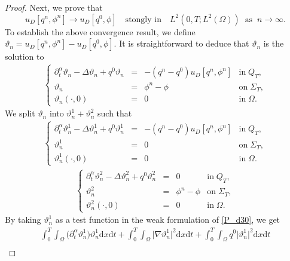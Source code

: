 \documentclass[10pt,a4paper]{amsart}
\newcommand{\dt} {\displaystyle\mathrm{d}t}
\newcommand{\dx} {\displaystyle\mathrm{d}x}
\begin{document}
\begin{proof}
Next, we prove that
\begin{equation}\label{convergancefaible-DDD}
    u_D[q^n, \phi^n] \longrightarrow u_D[q^0, \phi] \quad \text{stongly in} \quad L^2(0, T; L^2(\Omega)) \;\; \text{as} \;\; n \longrightarrow \infty.
\end{equation}
To establish the above convergence result, we define $\vartheta_n = u_D[q^n, \phi^n] - u_D[q^0, \phi]$. It is straightforward to deduce that $\vartheta_n$ is the solution to
\begin{eqnarray*} %
\left\{
  \begin{array}{rcll}
    \partial_t^\alpha \vartheta_n - \Delta \vartheta_n + q^0 \vartheta_n &=& -(q^n - q^0) u_D[q^n, \phi^n] & \text{in} \; Q_T, \\
    \vartheta_n &=& \phi^n - \phi & \text{on} \; \Sigma_T, \\
    \vartheta_n(\cdot, 0) &=& 0 & \text{in} \; \Omega.
  \end{array}
\right.
\end{eqnarray*}
We split $\vartheta_n$ into $\vartheta_n^1 + \vartheta_n^2$ such that
\begin{eqnarray} \label{P_d30}
\left\{
  \begin{array}{rcll}
    \partial_t^\alpha \vartheta_n^1 - \Delta \vartheta_n^1 + q^0 \vartheta_n^1 &=& -(q^n - q^0) u_D[q^n, \phi^n] & \text{in} \; Q_T, \\
    \vartheta_n^1 &=& 0 & \text{on} \; \Sigma_T, \\
    \vartheta_n^1(\cdot, 0) &=& 0 & \text{in} \; \Omega.
  \end{array}
\right.
\end{eqnarray}
\begin{eqnarray*} %
\left\{
  \begin{array}{rcll}
    \partial_t^\alpha \vartheta_n^2 - \Delta \vartheta_n^2 + q^0 \vartheta_n^2 &=& 0 & \text{in} \; Q_T, \\
    \vartheta_n^2 &=& \phi^n - \phi & \text{on} \; \Sigma_T, \\
    \vartheta_n^2(\cdot, 0) &=& 0 & \text{in} \; \Omega.
  \end{array}
\right.
\end{eqnarray*}
By taking $\vartheta_n^1$ as a test function in the weak formulation of \eqref{P_d30}, we get
\begin{align*}
    \int_0^T \int_\Omega \Big(\partial_t^\alpha \vartheta_n^1\Big) \vartheta_n^1 \dx \dt + \int_0^T \int_\Omega \Big|\nabla \vartheta_n^1\Big|^2 \dx \dt + \int_0^T \int_\Omega q^0 \Big|\vartheta_n^1\Big|^2 \dx \dt \\

\end{align*}
\end{proof}
\end{document}
